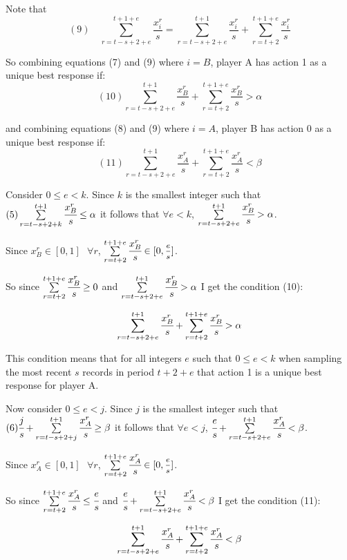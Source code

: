 \documentclass{article}
\begin{document}
Note that
$$(9) \hspace{12pt} \sum\limits_{r=t-s+2+e}^{t+1+e} \frac{x^r_i}{s} = \sum\limits_{r=t-s+2+e}^{t+1}\frac{x^r_i}{s}+\sum\limits_{r=t+2}^{t+1+e} \frac{x^r_i}{s}$$

So combining equations (7) and (9) where $i=B$, player A has action 1 as a unique best response if: 
$$(10) \sum\limits_{r=t-s+2+e}^{t+1}\frac{x^r_B}{s}+\sum\limits_{r=t+2}^{t+1+e} \frac{x^r_B}{s} > \alpha$$

and combining equations (8) and (9) where $i=A$, player B has action 0 as a unique best response if:
$$(11) \sum\limits_{r=t-s+2+e}^{t+1}\frac{x^r_A}{s}+\sum\limits_{r=t+2}^{t+1+e} \frac{x^r_A}{s} < \beta$$

\vskip18pt

Consider $0 \leq e<k$. Since $k$ is the smallest integer such that $(5) \sum\limits_{r=t-s+2+k}^{t+1} \cfrac{x^r_B}{s} \leq \alpha$ it follows that $\forall e<k$, $\sum\limits_{r=t-s+2+e}^{t+1} \cfrac{x^r_B}{s} > \alpha$.

Since $x_B^r \in [0,1] \hspace{8pt} \forall r$, $\sum\limits_{r=t+2}^{t+1+e} \cfrac{x^r_B}{s} \in [0,\mfrac{e}{s}]$.

So since $\sum\limits_{r=t+2}^{t+1+e} \cfrac{x^r_B}{s} \geq 0$ and $\sum\limits_{r=t-s+2+e}^{t+1} \cfrac{x^r_B}{s} > \alpha$ I get the condition (10):

$$\sum\limits_{r=t-s+2+e}^{t+1}\cfrac{x^r_B}{s}+\sum\limits_{r=t+2}^{t+1+e} \cfrac{x^r_B}{s} > \alpha$$

This condition means that for all integers $e$ such that $0 \leq e<k$ when sampling the most recent $s$ records in period $t+2+e$ that action 1 is a unique best response for player A.

\vskip18pt

Now consider $0 \leq e<j$. Since $j$ is the smallest integer such that $(6) \cfrac{j}{s}+\sum\limits_{r=t-s+2+j}^{t+1} \cfrac{x^r_A}{s} \geq \beta$ it follows that $\forall e<j$, $\cfrac{e}{s}+\sum\limits_{r=t-s+2+e}^{t+1} \cfrac{x^r_A}{s} < \beta$.

Since $x_A^r \in [0,1] \hspace{8pt} \forall r$, $\sum\limits_{r=t+2}^{t+1+e} \cfrac{x^r_A}{s} \in [0,\mfrac{e}{s}]$.

So since $\sum\limits_{r=t+2}^{t+1+e} \cfrac{x^r_A}{s} \leq \cfrac{e}{s}$ and $\cfrac{e}{s}+\sum\limits_{r=t-s+2+e}^{t+1} \cfrac{x^r_A}{s} < \beta$ I get the condition (11):

$$\sum\limits_{r=t-s+2+e}^{t+1}\cfrac{x^r_A}{s}+\sum\limits_{r=t+2}^{t+1+e} \cfrac{x^r_A}{s} < \beta$$
\end{document}
